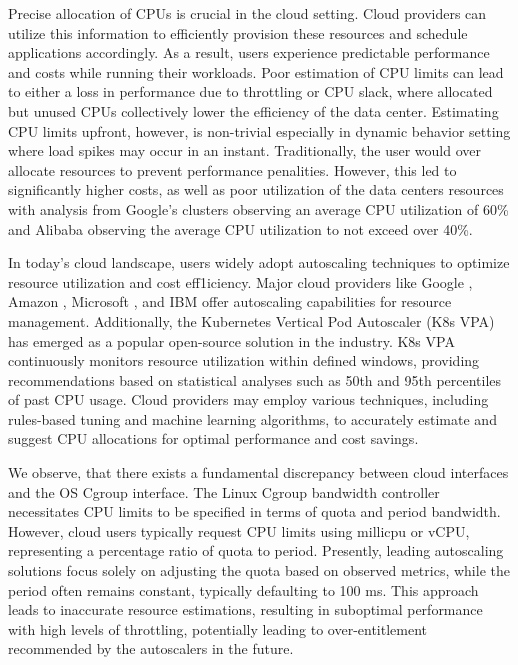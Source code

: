 
Precise allocation of CPUs is crucial in the cloud setting. Cloud providers can utilize this information to efficiently provision these resources and schedule applications accordingly. As a result, users experience predictable performance and costs while running their workloads. Poor estimation of CPU limits can lead to either a loss in performance due to throttling or CPU slack, where allocated but unused CPUs collectively lower the efficiency of the data center. Estimating CPU limits upfront, however, is non-trivial especially in dynamic behavior setting where load spikes may occur in an instant. Traditionally, the user would over allocate resources to prevent performance penalities. However, this led to significantly higher costs, as well as poor utilization of the data centers resources with analysis from Google's clusters \cite{reiss_heterogeneity_nodate} observing an average CPU utilization of 60\% and Alibaba\cite {lu_imbalance_2017} observing the average CPU utilization to not exceed over 40\%.

In today's cloud landscape, users widely adopt autoscaling techniques to optimize resource utilization and cost eff1iciency. Major cloud providers like Google \cite{rzadca_autopilot_2020}, Amazon \cite{noauthor_aws_nodate}, Microsoft \cite{edb-msft_autoscale_2023}, and IBM \cite{noauthor_ibm_nodate} offer autoscaling capabilities for resource management. Additionally, the Kubernetes Vertical Pod Autoscaler (K8s VPA) \cite{noauthor_kubernetes_nodate} has emerged as a popular open-source solution in the industry. K8s VPA continuously monitors resource utilization within defined windows, providing recommendations based on statistical analyses such as 50th and 95th percentiles of past CPU usage. Cloud providers may employ various techniques, including rules-based tuning and machine learning algorithms, to accurately estimate and suggest CPU allocations for optimal performance and cost savings.


We observe, that there exists a fundamental discrepancy between cloud interfaces and the OS Cgroup interface. The Linux Cgroup bandwidth controller necessitates CPU limits to be specified in terms of quota and period bandwidth. However, cloud users typically request CPU limits using millicpu or vCPU, representing a percentage ratio of quota to period. Presently, leading autoscaling solutions focus solely on adjusting the quota based on observed metrics, while the period often remains constant, typically defaulting to 100 ms. This approach leads to inaccurate resource estimations, resulting in suboptimal performance with high levels of throttling, potentially leading to over-entitlement recommended by the autoscalers in the future.

